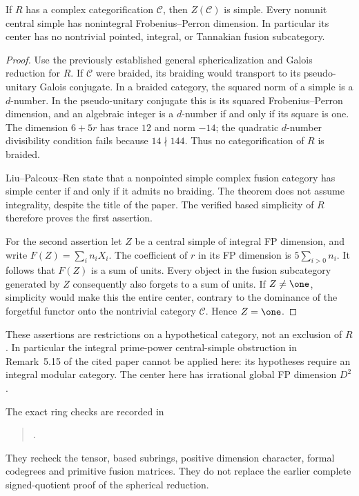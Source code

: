\begin{proposition}
If $R$ has a complex categorification $\mathcal C$, then
$Z(\mathcal C)$ is simple. Every nonunit central simple has nonintegral
Frobenius--Perron dimension. In particular its center has no nontrivial
pointed, integral, or Tannakian fusion subcategory.
\end{proposition}
\begin{proof}
Use the previously established general sphericalization and Galois
reduction for $R$. If $\mathcal C$ were braided, its braiding would
transport to its pseudo-unitary Galois conjugate. In a braided category,
the squared norm of a simple is a $d$-number. In the pseudo-unitary
conjugate this is its squared Frobenius--Perron dimension, and an
algebraic integer is a $d$-number if and only if its square is one.
The dimension $6+5r$ has trace $12$ and norm $-14$; the quadratic
$d$-number divisibility condition fails because $14\nmid144$.
Thus no categorification of $R$ is braided.

Liu--Palcoux--Ren \cite[Theorem~5.1]{LPRSimpleFocus} state that a nonpointed simple
complex fusion category has simple center if and only if it admits
no braiding. The theorem does not assume integrality, despite the
title of the paper. The verified based simplicity of $R$ therefore
proves the first assertion.

For the second assertion let $Z$ be a central simple of integral
FP dimension, and write $F(Z)=\sum_i n_iX_i$. The coefficient of $r$
in its FP dimension is $5\sum_{i>0}n_i$. It follows that $F(Z)$ is
a sum of units. Every object in the fusion subcategory generated by
$Z$ consequently also forgets to a sum of units. If $Z\ne\one$,
simplicity would make this the entire center, contrary to the
dominance of the forgetful functor onto the nontrivial category
$\mathcal C$. Hence $Z=\one$.
\end{proof}

These assertions are restrictions on a hypothetical category, not an
exclusion of $R$. In particular the integral prime-power central-simple
obstruction in Remark~5.15 of the cited paper cannot be applied here:
its hypotheses require an integral modular category. The center here
has irrational global FP dimension $D^2$.

The exact ring checks are recorded in
\begin{quote}\small
{}.
\end{quote}
They recheck the tensor, based subrings, positive dimension character,
formal codegrees and primitive fusion matrices. They do not replace
the earlier complete signed-quotient proof of the spherical reduction.


